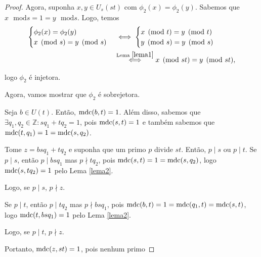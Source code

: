 \begin{proof}
		\par\vspace{0.3cm} Agora, suponha $x,y\in U_s(st)$ com 
		$\phi_2(x) = \phi_2(y)$. Sabemos que 
		$x\text{ }\mathrm{mod} s = 1 = y\text{ }\mathrm{mod} s$. Logo, temos
		\begin{align*}
            \begin{cases}
                \phi_2(x) = \phi_2(y) \\
                x\pmod s = y\pmod s
            \end{cases}
            &\iff
            \begin{cases}
                x\pmod t = y\pmod t \\
                y\pmod s = y\pmod s
            \end{cases} \\
            &\overset{\text{Lema } \ref{lema1}}{\iff } x\pmod {st} = y\pmod{st},
		\end{align*}
		\par\vspace{0.3cm} logo $\phi_2$ é injetora.
		\par\vspace{0.3cm} Agora, vamos mostrar que $\phi_2$ é sobrejetora.
		\par\vspace{0.3cm} Seja $b\in U(t)$. Então, $\operatorname{mdc}(b,t) = 1$. 
		Além disso, sabemos que 
		$\exists q_1, q_2\in\mathbb{Z}: sq_1 + tq_2 = 1$, pois 
		$\operatorname{mdc}(s,t) = 1$ e também sabemos que $\operatorname{mdc}(t,q_1) = 1 = \operatorname{mdc}(s, q_2)$.
		\par\vspace{0.3cm} Tome $z = bsq_1 + tq_2$ e suponha que um primo 
		$p$ divide $st$. Então, $p\mid s$ ou $p\mid t$. Se $p\mid s$, então
		$p\mid bsq_1$ mas $p\nmid tq_2$, pois $\operatorname{mdc}(s,t) = 1 = \operatorname{mdc}(s,q_2)$,
		logo $\operatorname{mdc}(s, tq_2) = 1$ pelo Lema \ref{lema2}.
		\par\vspace{0.3cm} Logo, se $p\mid s$, $p\nmid z$.
		\par\vspace{0.3cm} Se $p\mid t$, então $p\mid tq_2$ mas 
		$p\nmid bsq_1$, pois $\operatorname{mdc}(b,t) = 1 = \operatorname{mdc}(q_1, t) = \operatorname{mdc}(s,t)$, 
		logo $\operatorname{mdc}(t, bsq_1) = 1$ pelo Lema \ref{lema2}.
		\par\vspace{0.3cm} Logo, se $p\mid t$, $p\nmid z$.
		\par\vspace{0.3cm} Portanto, $\operatorname{mdc}(z, st) = 1$, pois nenhum primo 

\end{proof}
